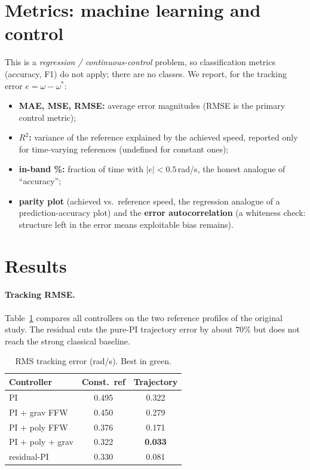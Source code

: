 \documentclass[10pt,twocolumn]{article}
\begin{document}
\section{Metrics: machine learning and control}
This is a \emph{regression / continuous-control} problem, so
classification metrics (accuracy, F1) do not apply; there are no
classes. We report, for the tracking error $e=\omega-\omega^\ast$:
\begin{itemize}\setlength\itemsep{1pt}
\item \textbf{MAE, MSE, RMSE:} average error magnitudes (RMSE is the
primary control metric);
\item \textbf{$R^2$:} variance of the reference explained by the
achieved speed, reported only for time-varying references (undefined for
constant ones);
\item \textbf{in-band \%:} fraction of time with $|e|<0.5$\,rad/s, the
honest analogue of ``accuracy'';
\item \textbf{parity plot} (achieved vs.\ reference speed, the regression
analogue of a prediction-accuracy plot) and the \textbf{error
autocorrelation} (a whiteness check: structure left in the error means
exploitable bias remains).
\end{itemize}

\section{Results}
\label{sec:results}
\paragraph{Tracking RMSE.} Table~\ref{tab:rmse} compares all controllers
on the two reference profiles of the original study. The residual cuts the
pure-PI trajectory error by about $70\%$ but does not reach the strong
classical baseline.

\begin{table}[h]
\centering
\caption{RMS tracking error (rad/s). Best in green.}
\label{tab:rmse}
\small
\begin{tabular}{lcc}
\toprule
\textbf{Controller} & \textbf{Const.\ ref} & \textbf{Trajectory}\\
\midrule
PI                          & 0.495 & 0.322 \\
PI + grav FFW               & 0.450 & 0.279 \\
PI + poly FFW               & 0.376 & 0.171 \\
\rowcolor{bestrow}
PI + poly + grav            & 0.322 & \textbf{0.033} \\
residual-PI                 & 0.330 & 0.081 \\
\bottomrule
\end{tabular}
\end{table}
\end{document}

